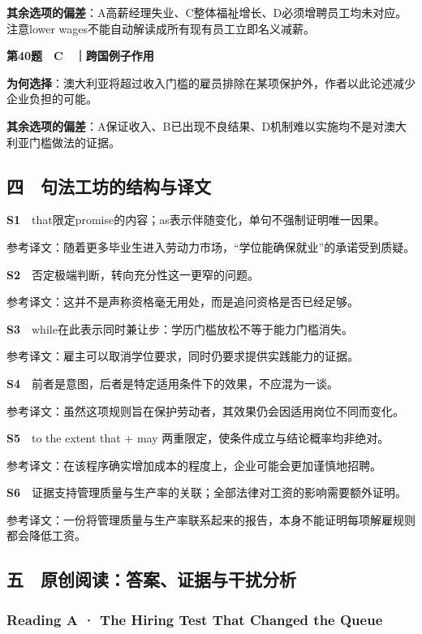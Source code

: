 \documentclass[
  11pt,
]{ctexart}
\begin{document}
\textbf{其余选项的偏差}：A高薪经理失业、C整体福祉增长、D必须增聘员工均未对应。注意lower
wages不能自动解读成所有现有员工立即名义减薪。

\textbf{第40题　C　｜跨国例子作用}

\textbf{为何选择}：澳大利亚将超过收入门槛的雇员排除在某项保护外，作者以此论述减少企业负担的可能。

\textbf{其余选项的偏差}：A保证收入、B已出现不良结果、D机制难以实施均不是对澳大利亚门槛做法的证据。

\subsection{四　句法工坊的结构与译文}\label{ux56db-ux53e5ux6cd5ux5de5ux574aux7684ux7ed3ux6784ux4e0eux8bd1ux6587}

\textbf{S1}　that限定promise的内容；as表示伴随变化，单句不强制证明唯一因果。

参考译文：随着更多毕业生进入劳动力市场，``学位能确保就业''的承诺受到质疑。

\textbf{S2}　否定极端判断，转向充分性这一更窄的问题。

参考译文：这并不是声称资格毫无用处，而是追问资格是否已经足够。

\textbf{S3}　while在此表示同时兼让步：学历门槛放松不等于能力门槛消失。

参考译文：雇主可以取消学位要求，同时仍要求提供实践能力的证据。

\textbf{S4}　前者是意图，后者是特定适用条件下的效果，不应混为一谈。

参考译文：虽然这项规则旨在保护劳动者，其效果仍会因适用岗位不同而变化。

\textbf{S5}　to the extent that + may
两重限定，使条件成立与结论概率均非绝对。

参考译文：在该程序确实增加成本的程度上，企业可能会更加谨慎地招聘。

\textbf{S6}　证据支持管理质量与生产率的关联；全部法律对工资的影响需要额外证明。

参考译文：一份将管理质量与生产率联系起来的报告，本身不能证明每项解雇规则都会降低工资。

\subsection{五　原创阅读：答案、证据与干扰分析}\label{ux4e94-ux539fux521bux9605ux8bfbux7b54ux6848ux8bc1ux636eux4e0eux5e72ux6270ux5206ux6790}

\subsubsection{Reading A · The Hiring Test That Changed the
Queue}\label{reading-a-the-hiring-test-that-changed-the-queue-1}
\end{document}
